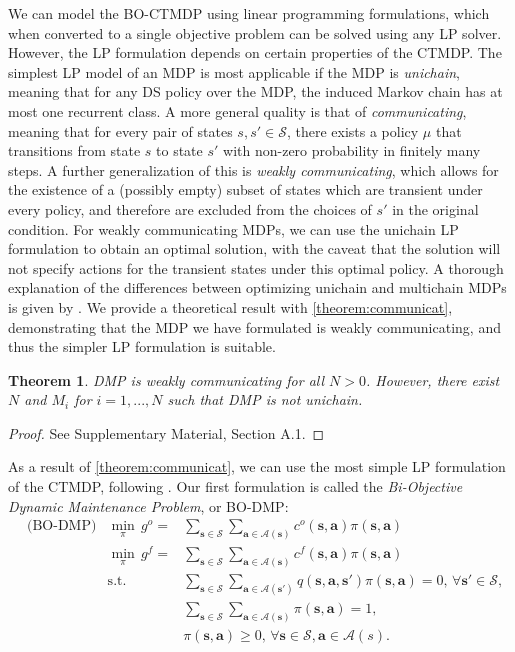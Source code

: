 \documentclass[11pt,authoryear,a4paper]{article}
\newtheorem{theorem}{Theorem}
\theoremstyle{definition}
\begin{document}
We can model the BO-CTMDP using linear programming formulations, which when converted to a single objective problem can be solved using any LP solver. However, the LP formulation depends on certain properties of the CTMDP. The simplest LP model of an MDP is most applicable if the MDP is \emph{unichain}, meaning that for any DS policy over the MDP, the induced Markov chain has at most one recurrent class. A more general quality is that of \emph{communicating}, meaning that for every pair of states $s,s'\in\mathcal{S}$, there exists a policy $\mu$ that {\color{black}transitions} from state $s$ to state $s'$ with non-zero probability in finitely many steps. A further generalization of this is \emph{weakly communicating}, which allows for the existence of a (possibly empty) subset of states which are transient under every policy, and therefore are excluded from the choices of $s'$ in the original condition. For weakly communicating MDPs, we can use the unichain LP formulation to obtain an optimal solution, with the caveat that the solution will not specify actions for the transient states under this optimal policy. A thorough explanation of the differences between optimizing unichain and multichain MDPs is given by \cite{Puterman1994MarkovDP}. We {provide a theoretical result} with \autoref{theorem:communicat}, demonstrating that the MDP we have formulated is weakly communicating, and thus the simpler LP formulation is suitable.

\begin{theorem}
\label{theorem:communicat}
    DMP is weakly communicating for all $N>0$. However, there exist $N$ and $M_i$ for $i=1,...,N$ such that DMP is not unichain.
\end{theorem}
\begin{proof}
    See Supplementary Material, Section A.1.
\end{proof}

As a result of \autoref{theorem:communicat}, we can use the most simple LP formulation of the CTMDP, following \cite{xianping2009continuous}. Our first formulation is called the \emph{Bi-Objective Dynamic Maintenance Problem}, or BO-DMP:
\begin{align}
    &\text{(BO-DMP)}&\min_\pi\,g^o = &\sum_{\bm{s}\in \mathcal{S}}\sum_{\bm{a}\in \mathcal{A}(\bm{s})}c^o(\bm{s},\bm{a})\pi(\bm{s},\bm{a}) \label{mo-dmp-obj1}\\
    &&\min_\pi\,g^f = &\sum_{\bm{s}\in \mathcal{S}}\sum_{\bm{a}\in \mathcal{A}(\bm{s})}c^f(\bm{s},\bm{a})\pi(\bm{s},\bm{a})\label{mo-dmp-obj2}\\
    &&\text{s.t.} & \sum_{\bm{s}\in \mathcal{S}}\sum_{\bm{a}\in \mathcal{A}(\bm{s}')}q(\bm{s},\bm{a},\bm{s}')\pi(\bm{s},\bm{a}) = 0,\,\forall \bm{s}'\in \mathcal{S},\label{mo-dmp-balance}\\
    &&& \sum_{\bm{s}\in \mathcal{S}}\sum_{\bm{a}\in \mathcal{A}(\bm{s})}\pi(\bm{s},\bm{a}) = 1\label{mo-dmp-sumto1},\\
    &&& \pi(\bm{s},\bm{a}) \geq 0,\,\forall \bm{s}\in \mathcal{S}, \bm{a}\in \mathcal{A}(s). \label{mo-dmp-pos}
\end{align}
\end{document}

